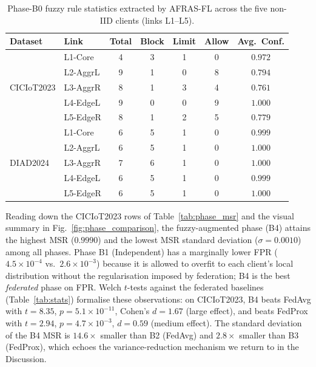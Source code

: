 \documentclass[ai,article,submit,moreauthors,pdftex]{Definitions/mdpi}
\begin{document}
\begin{table}[!htbp]
  \centering
  \caption{Phase-B0 fuzzy rule statistics extracted by AFRAS-FL across the
  five non-IID clients (links L1--L5).}\label{tab:phase_b0}
  \small
  \begin{tabular}{@{}llccccc@{}}
    \toprule
    \textbf{Dataset} & \textbf{Link} & \textbf{Total} & \textbf{Block} & \textbf{Limit} & \textbf{Allow} & \textbf{Avg.\ Conf.} \\
    \midrule
    \multirow{5}{*}{CICIoT2023}
      & L1-Core  & 4 & 3 & 1 & 0 & $0.972$ \\
      & L2-AggrL & 9 & 1 & 0 & 8 & $0.794$ \\
      & L3-AggrR & 8 & 1 & 3 & 4 & $0.761$ \\
      & L4-EdgeL & 9 & 0 & 0 & 9 & $1.000$ \\
      & L5-EdgeR & 8 & 1 & 2 & 5 & $0.779$ \\
    \midrule
    \multirow{5}{*}{DIAD2024}
      & L1-Core  & 6 & 5 & 1 & 0 & $0.999$ \\
      & L2-AggrL & 6 & 5 & 1 & 0 & $1.000$ \\
      & L3-AggrR & 7 & 6 & 1 & 0 & $1.000$ \\
      & L4-EdgeL & 6 & 5 & 1 & 0 & $0.999$ \\
      & L5-EdgeR & 6 & 5 & 1 & 0 & $1.000$ \\
    \bottomrule
  \end{tabular}
\end{table}

Reading down the CICIoT2023 rows of Table~\ref{tab:phase_msr} and
the visual summary in Fig.~\ref{fig:phase_comparison}, the
fuzzy-augmented phase (B4) attains the highest MSR ($0.9990$) and
the lowest MSR standard deviation ($\sigma = 0.0010$) among all
phases. Phase B1 (Independent) has a marginally lower FPR
($4.5 \times 10^{-4}$ vs.\ $2.6 \times 10^{-3}$) because it is
allowed to overfit to each client's local distribution without the
regularisation imposed by federation; B4 is the best \emph{federated}
phase on FPR. Welch $t$-tests against the federated baselines
(Table~\ref{tab:stats}) formalise these observations: on
CICIoT2023, B4 beats FedAvg with $t = 8.35$, $p = 5.1 \times
10^{-11}$, Cohen's $d = 1.67$ (large effect), and beats FedProx
with $t = 2.94$, $p = 4.7 \times 10^{-3}$, $d = 0.59$ (medium
effect). The standard deviation of the B4 MSR is $14.6\times$
smaller than B2 (FedAvg) and $2.8\times$ smaller than B3 (FedProx),
which echoes the variance-reduction mechanism we return to in the
Discussion.
\end{document}
